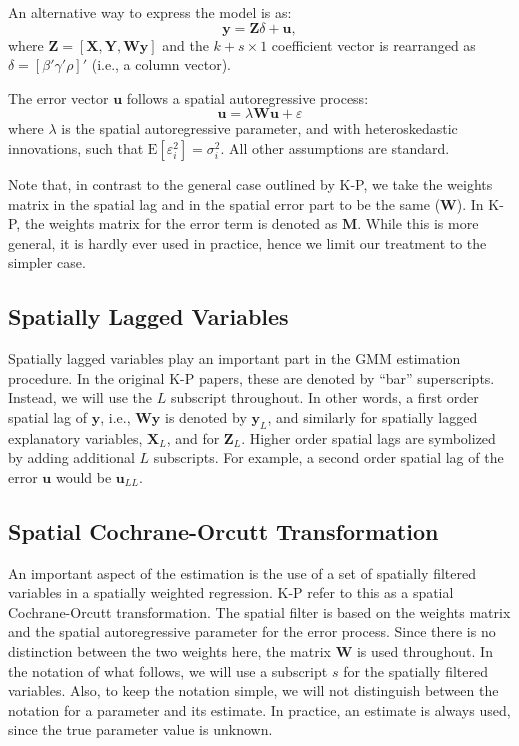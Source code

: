 \documentclass{article}
\begin{document}
An alternative way to express the model is as:
\begin{equation}\label{eq:generic}
\mathbf{y} = \mathbf{Z} \delta + \mathbf{u},
\end{equation}
where $\mathbf{Z} = [ \mathbf{X}, \mathbf{Y}, \mathbf{Wy} ]$ and the $k + s \times 1$ coefficient
vector is rearranged as $\delta = [\beta' \gamma'  \rho ]'$ (i.e., a column vector).

The error vector $\mathbf{u}$ follows a spatial autoregressive process:
\begin{equation*}
    \mathbf{u} = \lambda \mathbf{W u} + \varepsilon
    \label{model2}
\end{equation*}
where $\lambda$ is the spatial autoregressive parameter, and with heteroskedastic 
innovations, such that $\mbox{E}[\varepsilon_i^2] = \sigma_i^2$. All other assumptions
are standard.


Note that, in contrast to the general case outlined by K-P, we take the weights
matrix in the spatial lag and in the spatial error part to be the same ($\mathbf{W}$). In K-P, the
weights matrix for the error term is denoted as $\mathbf{M}$. While this is more
general, it is hardly ever used in practice, hence we limit our treatment to the
simpler case.

\subsection{Spatially Lagged Variables}
Spatially lagged variables play an important part in the GMM estimation procedure.
In the original K-P papers, these are denoted by ``bar'' superscripts. Instead, we will
use the $L$ subscript throughout. In other words, a first order spatial lag of $\mathbf{y}$, 
i.e., $\mathbf{Wy}$ is denoted by $\mathbf{y}_L$, and similarly for spatially lagged
explanatory variables, $\mathbf{X}_L$, and for $\mathbf{Z}_L$. Higher order spatial lags
are symbolized by adding additional $L$ subscripts. For example, a second order 
spatial lag of the error $\mathbf{u}$ would be $\mathbf{u}_{LL}$.


\subsection{Spatial Cochrane-Orcutt Transformation}
An important aspect of the estimation is the use of a set of spatially filtered variables
in a spatially weighted regression. K-P refer to this as a spatial Cochrane-Orcutt transformation.
The spatial filter is based on the weights matrix  and the
spatial autoregressive parameter for the error process. Since there is no
distinction between the two weights here, the matrix $\mathbf{W}$ is used throughout.
In the notation of what follows, we will use a subscript $s$ for the spatially filtered variables. Also, to keep the notation simple, we will not distinguish between the notation
for a parameter and its estimate. In practice, an estimate is always used, since the true
parameter value is unknown.
\end{document}
